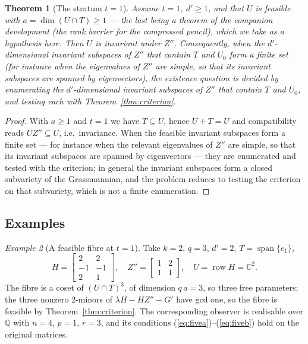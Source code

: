\documentclass[journal]{IEEEtran}
\theoremstyle{plainn}
\newtheorem{thm}{Theorem}
\theoremstyle{remark}
\newtheorem{example}[thm]{Example}
\begin{document}
\begin{thm}[The stratum $t=1$]\label{thm:t1}
Assume $t=1$, $d'\ge1$, and that $U$ is feasible with $a=\dim(U\cap T)\ge1$ --- the last being a
theorem of the companion development (the rank barrier for the compressed pencil), which we take as a
hypothesis here. Then $U$ is
invariant under $Z''$. Consequently, when the $d'$-dimensional invariant subspaces of $Z''$ that contain
$T$ and $U_0$ form a finite set (for instance when the eigenvalues of $Z''$ are simple, so that its
invariant subspaces are spanned by eigenvectors), the existence question is decided by enumerating the
$d'$-dimensional invariant subspaces of $Z''$ that contain $T$ and $U_0$, and testing each with
Theorem~\ref{thm:criterion}.
\end{thm}

\begin{proof}
With $a\ge1$ and $t=1$ we have $T\subseteq U$, hence $U+T=U$ and compatibility reads
$UZ''\subseteq U$, i.e.\ invariance. When the feasible invariant subspaces form a finite set --- for instance when the relevant eigenvalues of $Z''$ are simple, so that its invariant subspaces are spanned by eigenvectors --- they are enumerated and tested with the criterion; in general the invariant subspaces form a closed subvariety of the Grassmannian, and the problem reduces to testing the criterion on that subvariety, which is not a finite enumeration.
\end{proof}

\subsection{Examples}\label{sec:examples}

\begin{example}[A feasible fibre at $t=1$]\label{ex:feasible}
Take $k=2$, $q=3$, $d'=2$, $T=\operatorname{span}\{e_1\}$,
\[
H=\begin{bmatrix}2&2\\-1&-1\\2&1\end{bmatrix},\quad
Z''=\begin{bmatrix}1&2\\1&1\end{bmatrix},\quad U=\operatorname{row}H=\mathbb C^{2}.
\]
The fibre is a coset of $(U\cap T)^{3}$, of dimension $q\,a=3$, so three free parameters; the three
nonzero $2$-minors of $\lambda H-HZ''-G'$ have gcd one, so the fibre is feasible by
Theorem~\ref{thm:criterion}. The corresponding observer is realisable over $\mathbb Q$ with $n=4$,
$p=1$, $r=3$, and its conditions (\ref{eq:fivea})--(\ref{eq:fiveb}) hold on the original matrices.
\end{example}
\end{document}
